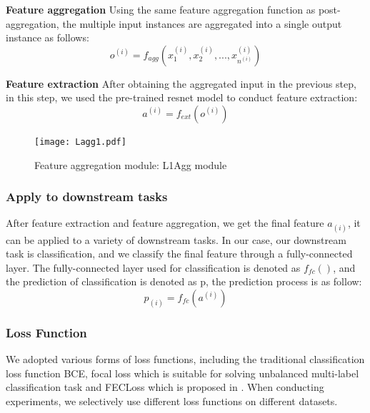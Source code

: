 \documentclass[10pt,twocolumn,letterpaper]{article}
\begin{document}
\textbf{Feature aggregation}
Using the same feature aggregation function as post-aggregation, the multiple input instances are aggregated into a single output instance as follows:
\begin{equation}
    o^{(i)} = f_{agg}(x^{(i)}_1, x^{(i)}_2, ..., x^{(i)}_{n^{(i)}})
\end{equation}

\textbf{Feature extraction}
After obtaining the aggregated input in the previous step, in this step, we used the pre-trained resnet model to conduct feature extraction:
\begin{equation}
    a^{(i)} = f_{ext}(o^{(i)})
\end{equation}

\begin{figure}[t]
\begin{center}
  \texttt{[image: Lagg1.pdf]}
\end{center}
   \caption{Feature aggregation module: L1Agg module}
\label{fig:long}
\label{fig:onecol}
\end{figure}

\subsubsection{Apply to downstream tasks}
After feature extraction and feature aggregation, we get the final feature $a_{(i)}$, it can be applied to a variety of downstream tasks. In our case, our downstream task is classification, and we classify the final feature through a fully-connected layer. The fully-connected layer used for classification is denoted as $f_{fc}()$, and the prediction of classification is denoted as p, the prediction process is as follow:
\begin{equation}
    p_{(i)} = f_{fc}(a^{(i)})
\end{equation}

\subsubsection{Loss Function}
We adopted various forms of loss functions, including the traditional classification loss function BCE, focal loss which is suitable for solving unbalanced multi-label classification task and FECLoss which is proposed in \cite{ref27}. When conducting experiments, we selectively use different loss functions on different datasets.
\end{document}
